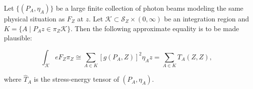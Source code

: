 Let $\{(P_A, \eta_A)\}$ be a large finite collection of photon beams modeling the same physical situation as $F_Z$ at $z$. Let $\mathcal{K} \subset \mathcal{S}_Z \times (0, \infty)$ be an integration region and $K = \{A \mid P_A z \in \pi_Z \mathcal{K}\}$. Then the following approximate equality is to be made plausible:

$$\int_{\mathcal{K}} eF_Z \pi_Z \cong \sum_{A \in K} [g(P_A, Z)]^2 \eta_A z = \sum_{A \in K} T_A(Z, Z),$$

where $\hat{T}_A$ is the stress-energy tensor of $(P_A, \eta_A)$.
